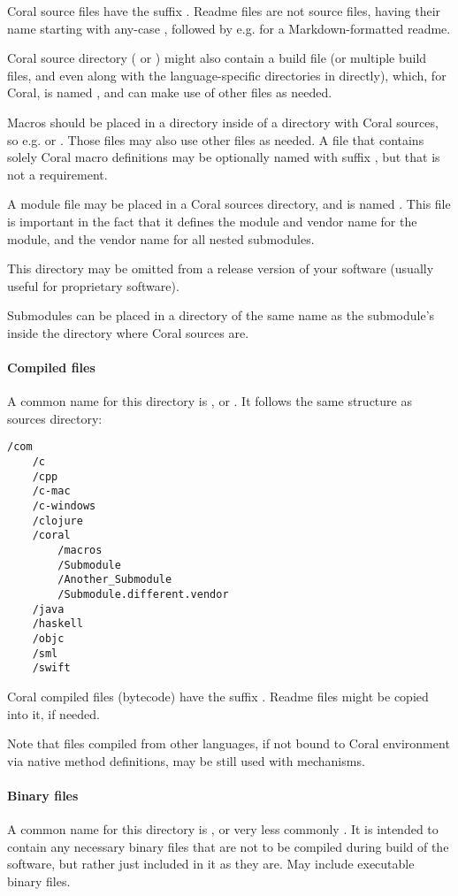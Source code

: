 Coral source files have the suffix . Readme files are not source files, having their name starting with any-case , followed by e.g.  for a Markdown-formatted readme. 

Coral source directory ( or ) might also contain a build file (or multiple build files, and even along with the language-specific directories in  directly), which, for Coral, is named , and can make use of other files as needed. 

Macros should be placed in a  directory inside of a directory with Coral sources, so e.g.  or . Those files may also use other files as needed. A file that contains solely Coral macro definitions may be optionally named with suffix , but that is not a requirement. 

A module file may be placed in a Coral sources directory, and is named . This file is important in the fact that it defines the module and vendor name for the module, and the vendor name for all nested submodules. 

This directory may be omitted from a release version of your software (usually useful for proprietary software). 

Submodules can be placed in a directory of the same name as the submodule's inside the directory where Coral sources are. 

\paragraph{Compiled files}
A common name for this directory is , or . It follows the same structure as sources directory:
\begin{lstlisting}
/com
    /c
    /cpp
    /c-mac
    /c-windows
    /clojure
    /coral
        /macros
        /Submodule
        /Another_Submodule
        /Submodule.different.vendor
    /java
    /haskell
    /objc
    /sml
    /swift
\end{lstlisting}

Coral compiled files (bytecode) have the suffix . Readme files might be copied into it, if needed. 

Note that files compiled from other languages, if not bound to Coral environment via native method definitions, may be still used with  mechanisms. 

\paragraph{Binary files}
A common name for this directory is , or very less commonly . It is intended to contain any necessary binary files that are not to be compiled during build of the software, but rather just included in it as they are. May include executable binary files. 

